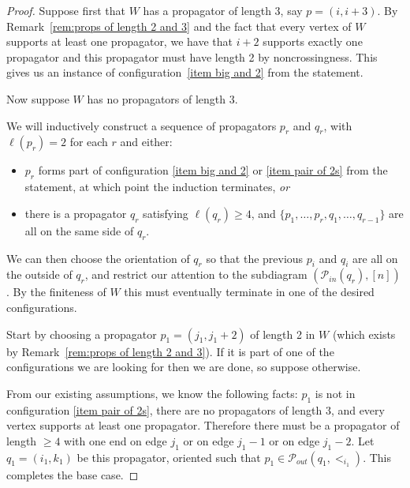 \documentclass[11pt]{article}
\newcommand{\cP}{\mathcal{P}}
\theoremstyle{remark}
\theoremstyle{definition}
\begin{document}
\begin{proof}
Suppose first that $W$ has a propagator of length $3$, say $p=(i, i+3)$.  By Remark~\ref{rem:props of length 2 and 3} and the fact that every vertex of $W$ supports at least one propagator, we have that $i+2$ supports exactly one propagator and this propagator must have length 2 by noncrossingness.  This gives us an instance of configuration~\ref{item big and 2} from the statement.

Now suppose $W$ has no propagators of length $3$.
  
We will inductively construct a sequence of propagators $p_r$ and $q_r$, with $\ell(p_r) = 2$ for each $r$ and either:
\begin{itemize}
\item $p_r$ forms part of configuration \ref{item big and 2} or \ref{item pair of 2s} from the statement, at which point the induction terminates, 
{\em or} 
\item there is a propagator $q_r$ satisfying $\ell(q_r) \geq 4$, and $\{p_1, \ldots, p_r, q_1, \ldots, q_{r-1}\}$ are all on the same side of $q_r$.  
\end{itemize}
We can then choose the orientation of $q_r$ so that the previous $p_i$ and $q_i$ are all on the outside of $q_r$, and restrict our attention to the subdiagram $(\cP_{in}(q_r),[n])$. By the finiteness of $W$ this must eventually terminate in one of the desired configurations. %

Start by choosing a propagator $p_1 = (j_1,j_1+2)$ of length 2 in $W$ (which exists by Remark~\ref{rem:props of length 2 and 3}).  If it is part of one of the configurations we are looking for then we are done, 
so suppose otherwise. 

From our existing assumptions, we know the following facts: $p_1$ is not in configuration \ref{item pair of 2s}, there are no propagators of length $3$, and every vertex supports at least one propagator.  Therefore there must be a propagator of length $\geq 4$ with one end on edge $j_1$ or on edge $j_1-1$ or on edge $j_1-2$.  Let $q_1 = (i_1, k_1)$ be this propagator, oriented such that $p_1 \in \cP_{out}(q_1,<_{i_1})$. This completes the base case.


\end{proof}
\end{document}
